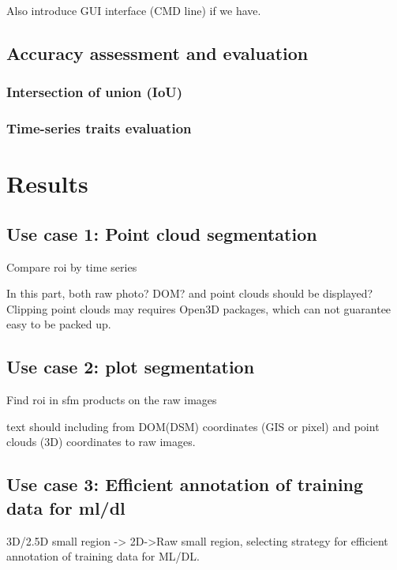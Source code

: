 \documentclass[sensors,article,submit,moreauthors, xelatex]{Definitions/mdpi}
\begin{document}
Also introduce GUI interface (CMD line) if we have.

\subsection{Accuracy assessment and evaluation}
\subsubsection{Intersection of union (IoU)}

\subsubsection{Time-series traits evaluation}


\section{Results}

\subsection{Use case 1: Point cloud segmentation}
Compare \acrshort*{roi} by time series

In this part, both raw photo? DOM? and point clouds should be displayed? Clipping point clouds may requires Open3D packages, which can not guarantee easy to be packed up.

\subsection{Use case 2: plot segmentation}

Find \acrshort*{roi} in \acrshort*{sfm} products on the raw images

text \cite{ma_calculation_2019, guo_illumination_2013}
should including from DOM(DSM) coordinates (GIS or pixel) and point clouds (3D) coordinates to raw images.

\subsection{Use case 3: Efficient annotation of training data for \acrshort*{ml}/\acrshort*{dl}}
3D/2.5D small region -> 2D->Raw small region, selecting strategy for efficient annotation of training data for ML/DL.
\end{document}
